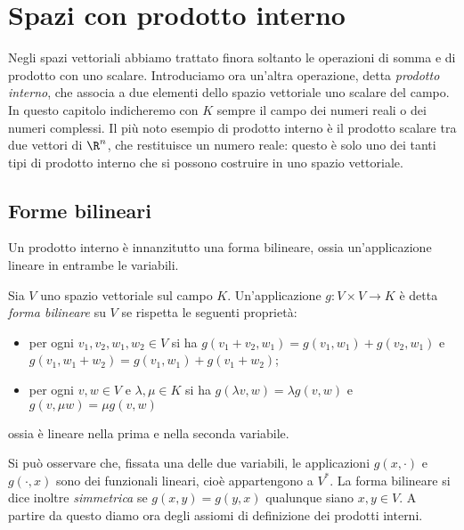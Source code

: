 \chapter{Spazi con prodotto interno} \label{ch:spazi-prodotto-interno}
Negli spazi vettoriali abbiamo trattato finora soltanto le operazioni di somma e di prodotto con uno scalare.
Introduciamo ora un'altra operazione, detta \emph{prodotto interno}, che associa a due elementi dello spazio vettoriale uno scalare del campo.
In questo capitolo indicheremo con $K$ sempre il campo dei numeri reali o dei numeri complessi.
Il più noto esempio di prodotto interno è il prodotto scalare tra due vettori di $\R^n$, che restituisce un numero reale: questo è solo uno dei tanti tipi di prodotto interno che si possono costruire in uno spazio vettoriale.
\section{Forme bilineari} \label{sec:forme-bilineari}
Un prodotto interno è innanzitutto una forma bilineare, ossia un'applicazione lineare in entrambe le variabili.
\begin{definizione} \label{d:forma-bilineare}
	Sia $V$ uno spazio vettoriale sul campo $K$.
	Un'applicazione $g\colon V\times V\to K$ è detta \emph{forma bilineare} su $V$ se rispetta le seguenti proprietà:
	\begin{itemize}
		\item per ogni $  v_1,  v_2,  w_1,  w_2\in V$ si ha $g(  v_1+  v_2,  w_1)=g(  v_1,  w_1)+g(  v_2,  w_1)$ e $g(  v_1,  w_1+  w_2)=g(  v_1,  w_1)+g(  v_1+  w_2)$;
		\item per ogni $  v,  w\in V$ e $\lambda,\mu\in K$ si ha $g(\lambda  v,  w)=\lambda g(  v,  w)$ e $g(  v,\mu  w)=\mu g(  v,  w)$
	\end{itemize}
	ossia è lineare nella prima e nella seconda variabile.
\end{definizione}
Si può osservare che, fissata una delle due variabili, le applicazioni $g(  x,\cdot)$ e $g(\cdot,  x)$ sono dei funzionali lineari, cioè appartengono a $V^*$.
La forma bilineare si dice inoltre \emph{simmetrica} se $g(  x,  y)=g(  y,  x)$ qualunque siano $  x,  y\in V$.
A partire da questo diamo ora degli assiomi di definizione dei prodotti interni.

